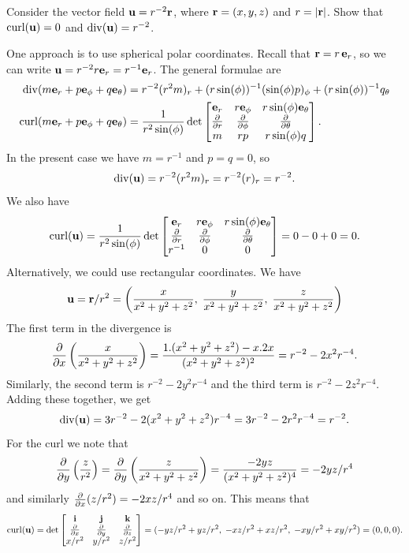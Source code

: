 \documentclass[a4paper]{amsart}
\renewenvironment{solution}{\SolutionInline}{\endSolutionInline}
\begin{document}
\begin{exercise}
 Consider the vector field $\mathbf{u}=r^{-2}\mathbf{r}$, where $\mathbf{r}=(x,y,z)$ and
 $r=|\mathbf{r}|$.  Show that $\operatorname{curl}(\mathbf{u})=0$ and $\operatorname{div}(\mathbf{u})=r^{-2}$.    
\end{exercise}
\begin{solution}
 One approach is to use spherical polar coordinates.  Recall that
 $\mathbf{r}=r\,\mathbf{e}_r$, so we can write $\mathbf{u}=r^{-2}r\mathbf{e}_r=r^{-1}\mathbf{e}_r$.  
 The general formulae are 
 \begin{align*}
  \operatorname{div}(m\mathbf{e}_r+p\mathbf{e}_\phi+q\mathbf{e}_\theta)
     &= r^{-2}(r^2m)_r + (r\sin(\phi))^{-1}(\sin(\phi)p)_\phi + 
         (r\sin(\phi))^{-1}q_\theta \\
  \operatorname{curl}(m\mathbf{e}_r+p\mathbf{e}_\phi+q\mathbf{e}_\theta)
     &= \frac{1}{r^2\sin(\phi)} \det\left[\begin{matrix}
          \mathbf{e}_r & r\mathbf{e}_\phi & r\sin(\phi)\mathbf{e}_\theta \\
          \frac{\partial}{\partial r}  & \frac{\partial}{\partial\phi}      & \frac{\partial}{\partial\theta}  \\
          m     & rp        & r\sin(\phi)q \end{matrix}\right].
 \end{align*}
 In the present case we have $m=r^{-1}$ and $p=q=0$, so 
 \[ \operatorname{div}(\mathbf{u}) = r^{-2}(r^2m)_r = r^{-2}(r)_r = r^{-2}. \]
 We also have
 \[ \operatorname{curl}(\mathbf{u}) 
     = \frac{1}{r^2\sin(\phi)} \det\left[\begin{matrix}
          \mathbf{e}_r & r\mathbf{e}_\phi & r\sin(\phi)\mathbf{e}_\theta \\
          \frac{\partial}{\partial r}  & \frac{\partial}{\partial\phi}      & \frac{\partial}{\partial\theta}  \\
          r^{-1} & 0        & 0 \end{matrix}\right]
     = 0 - 0 + 0 = 0.
 \]
 Alternatively, we could use rectangular coordinates.  We have 
 \[ \mathbf{u} = \mathbf{r}/r^2 =
     \left(\frac{x}{x^2+y^2+z^2},\;
           \frac{y}{x^2+y^2+z^2},\;
           \frac{z}{x^2+y^2+z^2}\right)
 \]
 The first term in the divergence is
 \[ \frac{\partial}{\partial x}\left(\frac{x}{x^2+y^2+z^2}\right) = 
     \frac{1.(x^2+y^2+z^2)-x.2x}{(x^2+y^2+z^2)^2} =
       r^{-2} - 2x^2r^{-4}.
 \]
 Similarly, the second term is $r^{-2}-2y^2r^{-4}$ and the third term
 is $r^{-2}-2z^2r^{-4}$.  Adding these together, we get
 \[ \operatorname{div}(\mathbf{u}) = 
     3r^{-2}-2(x^2+y^2+z^2)r^{-4} = 3r^{-2}-2r^2r^{-4} = r^{-2}.
 \]
 For the curl we note that 
 \[ \frac{\partial}{\partial y}\left(\frac{z}{r^2}\right) = 
    \frac{\partial}{\partial y}\left(\frac{z}{x^2+y^2+z^2}\right) =
    \frac{-2yz}{(x^2+y^2+z^2)^4} = -2yz/r^4
 \]
 and similarly $\frac{\partial}{\partial x}(z/r^2)=-2xz/r^4$ and so on.  This means that 
 \[ \operatorname{curl}(\mathbf{u}) = 
   \det\left[\begin{matrix} \mathbf{i} & \mathbf{j} & \mathbf{k} \\
            \frac{\partial}{\partial x} & \frac{\partial}{\partial y} & \frac{\partial}{\partial z} \\
            x/r^2 & y/r^2 & z/r^2 \end{matrix}\right] 
   = (-yz/r^2+yz/r^2,\;-xz/r^2+xz/r^2,\;-xy/r^2+xy/r^2)
   = (0,0,0).
 \]
\end{solution}
\end{document}
